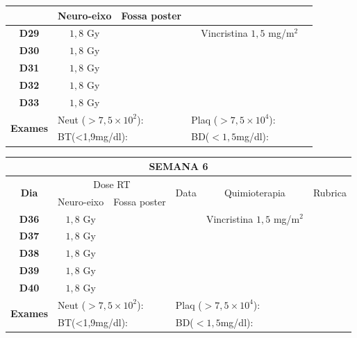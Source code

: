 \documentclass[11pt,a4paper,oldfontcommands]{memoir}
\begin{document}
\begin{center}
\begin{table}[H]
\begin{tabular}{p{1cm}p{2cm}|p{2cm}|p{1cm}|p{4cm}|p{3cm}}
    \cline{2-3}
    \multicolumn{1}{c|}{\multirow{1}{*}{}}&{Neuro-eixo}&{Fossa poster}&& \\
	\hline
	\multicolumn{1}{c|}{\multirow{1}{*}{\textbf{D29}}}&\multicolumn{1}{c|}{\(1,8\) Gy}&&&{Vincristina \(1,5\) mg/m\(^2\)}&\\
    \multicolumn{1}{c|}{\multirow{1}{*}{\textbf{D30}}}&\multicolumn{1}{c|}{\(1,8\) Gy}&&&{}&\\
    \multicolumn{1}{c|}{\multirow{1}{*}{\textbf{D31}}}&\multicolumn{1}{c|}{\(1,8\) Gy}&&&{}&\\
    \multicolumn{1}{c|}{\multirow{1}{*}{\textbf{D32}}}&\multicolumn{1}{c|}{\(1,8\) Gy}&&&{}&\\
    \multicolumn{1}{c|}{\multirow{1}{*}{\textbf{D33}}}&\multicolumn{1}{c|}{\(1,8\) Gy}&&&{}&\\
    \hline
    \multicolumn{1}{c|}{\multirow{2}{*}{\textbf{Exames}}}&\multicolumn{2}{l|}{Neut (\(>7,5\times10^2\)):}&\multicolumn{2}{l|}{Plaq (\(>7,5\times10^4\)):}&\\
    \cline{2-6}
    \multicolumn{1}{c|}{\multirow{2}{*}{{}}}&\multicolumn{2}{l|}{BT(<1,9mg/dl):}&\multicolumn{2}{l|}{BD(\(<1,5\)mg/dl):}&
    \\
    \hline
\end{tabular}
\end{table}
\begin{table}[H]
\begin{tabular}{p{1cm}p{2cm}|p{2cm}|p{1cm}|p{4cm}|p{3cm}}
	\hline
	\multicolumn{6}{c}{\textbf{SEMANA 6}}\\
\hline
    \multicolumn{1}{c|}{\multirow{2}{*}{\textbf{Dia}}}&\multicolumn{2}{c|}{Dose RT}&\multicolumn{1}{c|}{\multirow{2}{*}{Data}}&\multicolumn{1}{c|}{\multirow{2}{*}{Quimioterapia}}&\multicolumn{1}{c}{\multirow{2}{*}{Rubrica}} \\
    \cline{2-3}
    \multicolumn{1}{c|}{\multirow{1}{*}{}}&{Neuro-eixo}&{Fossa poster}&& \\
	\hline
	\multicolumn{1}{c|}{\multirow{1}{*}{\textbf{D36}}}&\multicolumn{1}{c|}{\(1,8\) Gy}&&&{Vincristina \(1,5\) mg/m\(^2\)}&\\
    \multicolumn{1}{c|}{\multirow{1}{*}{\textbf{D37}}}&\multicolumn{1}{c|}{\(1,8\) Gy}&&&{}&\\
    \multicolumn{1}{c|}{\multirow{1}{*}{\textbf{D38}}}&\multicolumn{1}{c|}{\(1,8\) Gy}&&&{}&\\
    \multicolumn{1}{c|}{\multirow{1}{*}{\textbf{D39}}}&\multicolumn{1}{c|}{\(1,8\) Gy}&&&{}&\\
    \multicolumn{1}{c|}{\multirow{1}{*}{\textbf{D40}}}&\multicolumn{1}{c|}{\(1,8\) Gy}&&&{}&\\
    \hline
    \multicolumn{1}{c|}{\multirow{2}{*}{\textbf{Exames}}}&\multicolumn{2}{l|}{Neut (\(>7,5\times10^2\)):}&\multicolumn{2}{l|}{Plaq (\(>7,5\times10^4\)):}&\\
    \cline{2-6}
    \multicolumn{1}{c|}{\multirow{2}{*}{{}}}&\multicolumn{2}{l|}{BT(<1,9mg/dl):}&\multicolumn{2}{l|}{BD(\(<1,5\)mg/dl):}&
    \\
    \hline
\end{tabular}
\end{table}


\end{center}
\end{document}
